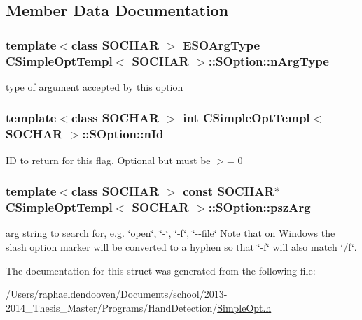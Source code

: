 \subsection{Member Data Documentation}
\hypertarget{struct_c_simple_opt_templ_1_1_s_option_a183ddbb6c06a3578db4dfb26fce16f21}{
\subsubsection[{n\-Arg\-Type}]{\setlength{\rightskip}{0pt plus 5cm}template$<$class S\-O\-C\-H\-A\-R $>$ {\bf E\-S\-O\-Arg\-Type} {\bf C\-Simple\-Opt\-Templ}$<$ S\-O\-C\-H\-A\-R $>$\-::S\-Option\-::n\-Arg\-Type}}\label{struct_c_simple_opt_templ_1_1_s_option_a183ddbb6c06a3578db4dfb26fce16f21}
type of argument accepted by this option \hypertarget{struct_c_simple_opt_templ_1_1_s_option_a10837f04451fe178b47f1c956db23964}{
\subsubsection[{n\-Id}]{\setlength{\rightskip}{0pt plus 5cm}template$<$class S\-O\-C\-H\-A\-R $>$ int {\bf C\-Simple\-Opt\-Templ}$<$ S\-O\-C\-H\-A\-R $>$\-::S\-Option\-::n\-Id}}\label{struct_c_simple_opt_templ_1_1_s_option_a10837f04451fe178b47f1c956db23964}
I\-D to return for this flag. Optional but must be $>$= 0 \hypertarget{struct_c_simple_opt_templ_1_1_s_option_a98c6fe397df4a04140d549373c18622b}{
\subsubsection[{psz\-Arg}]{\setlength{\rightskip}{0pt plus 5cm}template$<$class S\-O\-C\-H\-A\-R $>$ const S\-O\-C\-H\-A\-R$\ast$ {\bf C\-Simple\-Opt\-Templ}$<$ S\-O\-C\-H\-A\-R $>$\-::S\-Option\-::psz\-Arg}}\label{struct_c_simple_opt_templ_1_1_s_option_a98c6fe397df4a04140d549373c18622b}
arg string to search for, e.\-g. \char`\"{}open\char`\"{}, \char`\"{}-\/\char`\"{}, \char`\"{}-\/f\char`\"{}, \char`\"{}-\/-\/file\char`\"{} Note that on Windows the slash option marker will be converted to a hyphen so that \char`\"{}-\/f\char`\"{} will also match \char`\"{}/f\char`\"{}. 

The documentation for this struct was generated from the following file\-:\begin{DoxyCompactItemize}
\item 
/\-Users/raphaeldendooven/\-Documents/school/2013-\/2014\-\_\-\-Thesis\-\_\-\-Master/\-Programs/\-Hand\-Detection/\hyperlink{_simple_opt_8h}{Simple\-Opt.\-h}\end{DoxyCompactItemize}
